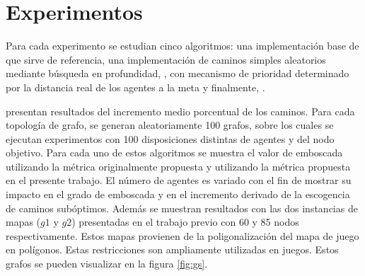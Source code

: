 \section{Experimentos}
\label{sec:experiments}

Para cada experimento se estudian cinco algoritmos:
una implementaci\'on base de \astar que sirve de referencia,
una implementaci\'on de caminos simples aleatorios mediante
b\'usqueda en profundidad, \ambush, \pambush con mecanismo
de prioridad determinado por la distancia real de los agentes
a la meta y finalmente, \sarambush.

presentan resultados del incremento medio porcentual de los caminos.
Para cada topolog\'ia de grafo, se generan aleatoriamente 100 grafos,
sobre los cuales se ejecutan experimentos con 100 disposiciones distintas
de agentes y del nodo objetivo.
Para cada uno de estos algoritmos se muestra el valor de emboscada
utilizando la m\'etrica originalmente propuesta y utilizando la
m\'etrica propuesta en el presente trabajo. El n\'umero de agentes
es variado con el fin de mostrar su impacto en el grado de emboscada
y en el incremento derivado de la escogencia de caminos sub\'optimos.
Adem\'as se muestran resultados con las dos instancias de mapas ($g1$ y $g2$)
presentadas en el trabajo previo \cite{FGC12} con 60 y 85 nodos
respectivamente. Estos mapas provienen de la poligonalizaci\'on del mapa
de juego en pol\'igonos. Estas restricciones son ampliamente utilizadas
en juegos\cite{MF09}. Estos grafos se pueden visualizar en la figura \ref{fig:gs}.

